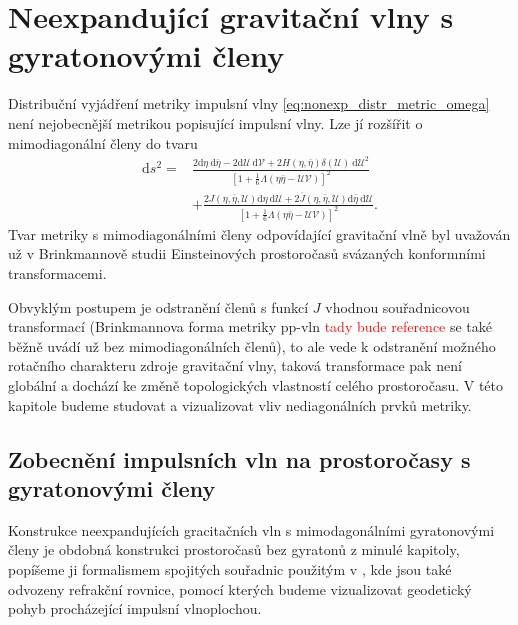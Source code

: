 \chapter{Neexpandující gravitační vlny s gyratonovými členy}
Distribuční vyjádření metriky impulsní vlny \eqref{eq:nonexp_distr_metric_omega} není nejobecnější metrikou popisující
impulsní vlny. Lze jí rozšířit o mimodiagonální členy do tvaru
\begin{equation}
    \label{eq:nonexp_gyra_distrib_metric_omega}
    \begin{split}
        \mathrm{d}s^2=&\frac{2\mathrm{d}\eta~\mathrm{d}\bar{\eta} - 2 \mathrm{d}\mathcal{U}~\mathrm{d}\mathcal{V} + 2H(\eta, \bar{\eta}) \delta(\mathcal{U}) 
        ~\mathrm{d}\mathcal{U}^2}{\left[1+\frac{1}{6}\Lambda(\eta \bar{\eta}-\mathcal{U}\mathcal{V})\right]^2} \\
        &+ \frac{2J\left(\eta, \bar{\eta}, \mathcal{U}\right) \mathrm{d}\eta~\mathrm{d}\mathcal{U}
        +2\overline{J}\left(\eta, \bar{\eta}, \mathcal{U}\right) \mathrm{d}\bar{\eta}~\mathrm{d}\mathcal{U}}{\left[1+\frac{1}{6}\Lambda(\eta \bar{\eta}-\mathcal{U}\mathcal{V})\right]^2}.
    \end{split}
\end{equation}
Tvar metriky s mimodiagonálními členy odpovídající gravitační vlně byl uvažován už v Brinkmannově studii \cite{Brinkmann1925} Einsteinových prostoročasů svázaných konformními transformacemi.

Obvyklým postupem je odstranění členů s funkcí $J$ vhodnou souřadnicovou transformací (Brinkmannova forma metriky pp-vln \textcolor{red}{tady bude reference} se také běžně uvádí už bez mimodiagonálních členů), to ale vede k odstranění
možného rotačního charakteru zdroje gravitační vlny, taková transformace pak není globální a dochází ke změně topologických vlastností celého prostoročasu.
V této kapitole budeme studovat a vizualizovat vliv nediagonálních prvků metriky.

\section{Zobecnění impulsních vln na prostoročasy s gyratonovými členy}
Konstrukce neexpandujících gracitačních vln s mimodagonálními gyratonovými členy je obdobná konstrukci prostoročasů bez gyratonů z minulé kapitoly, popíšeme ji formalismem spojitých souřadnic
použitým v \cite{Podolsky_2017}, kde jsou také odvozeny refrakční rovnice, pomocí kterých budeme vizualizovat geodetický pohyb procházející impulsní vlnoplochou.


